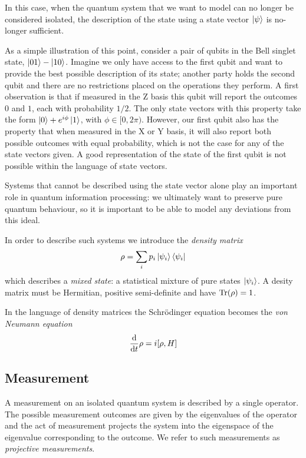 In this case, when the quantum system that we want to model can no longer be considered isolated, the description of the state using a state vector $\left\vert\psi\right\rangle$ is no-longer sufficient.

As a simple illustration of this point, consider a pair of qubits in the Bell singlet state, $\left\vert01\right\rangle - \left\vert10\right\rangle$. Imagine we only have access to the first qubit and want to provide the best possible description of its state; another party holds the second qubit and there are no restrictions placed on the operations they perform. A first observation is that if measured in the Z basis this qubit will report the outcomes $0$ and $1$, each with probability $1/2$. The only state vectors with this property take the form $\left\vert0\right\rangle + e^{i\phi}\left\vert1\right\rangle$, with $\phi \in [0, 2\pi)$. However, our first qubit also has the property that when measured in the X or Y basis, it will also report both possible outcomes with equal probability, which is not the case for any of the state vectors given. A good representation of the state of the first qubit is not possible within the language of state vectors.

Systems that cannot be described using the state vector alone play an important role in quantum information processing: we ultimately want to preserve pure quantum behaviour, so it is important to be able to model any deviations from this ideal.

In order to describe such systems we introduce the \textit{density matrix}
\begin{align}
  \rho = \sum_i p_i \left\vert\psi_i\right\rangle\left\langle \psi_i\right\vert 
\end{align}
which describes a \textit{mixed state}: a statistical mixture of pure states $\left\vert\psi_i\right\rangle$. A desity matrix must be Hermitian, positive semi-definite and have $\operatorname{Tr}(\rho) = 1$.

In the language of density matrices the Schr\"odinger equation becomes the \textit{von Neumann equation}
\begin{align}
  \frac{\mathrm{d}}{\mathrm{d}t} \rho = i [\rho, H]
\end{align}


\subsection{Measurement}

A measurement on an isolated quantum system is described by a single operator. The possible measurement outcomes are given by the eigenvalues of the operator and the act of measurement projects the system into the eigenspace of the eigenvalue corresponding to the outcome. We refer to such measurements as \textit{projective measurements}.

